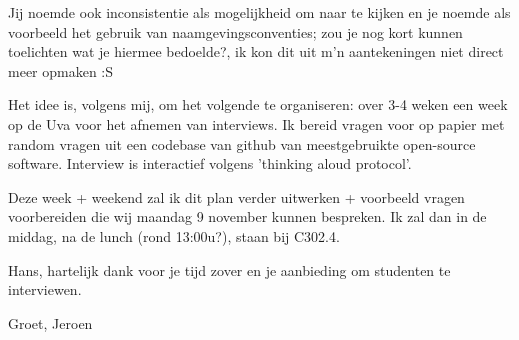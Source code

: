 Jij noemde ook inconsistentie als mogelijkheid om naar te kijken en je noemde als voorbeeld het gebruik van naamgevingsconventies; zou je nog kort kunnen toelichten wat je hiermee bedoelde?, ik kon dit uit m'n aantekeningen niet direct meer opmaken :S

Het idee is, volgens mij, om het volgende te organiseren: over 3-4 weken een week op de Uva voor het afnemen van interviews. Ik bereid vragen voor op papier met random vragen uit een codebase van github van meestgebruikte open-source software. Interview is interactief volgens 'thinking aloud protocol'.

Deze week + weekend zal ik dit plan verder uitwerken + voorbeeld vragen voorbereiden die wij maandag 9 november kunnen bespreken. Ik zal dan in de middag, na de lunch (rond 13:00u?), staan bij C302.4.

Hans, hartelijk dank voor je tijd zover en je aanbieding om studenten te interviewen.

Groet,
Jeroen